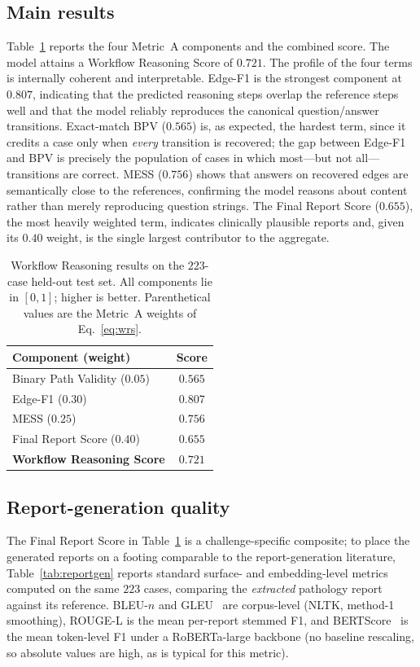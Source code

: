\documentclass[11pt]{article}
\begin{document}
\subsection{Main results}
Table~\ref{tab:test} reports the four Metric~A components and the combined score.
The model attains a Workflow Reasoning Score of $\mathbf{0.721}$. The profile of
the four terms is internally coherent and interpretable. Edge-F1 is the strongest
component at $0.807$, indicating that the predicted reasoning steps overlap the
reference steps well and that the model reliably reproduces the canonical
question/answer transitions. Exact-match BPV ($0.565$) is, as expected, the
hardest term, since it credits a case only when \emph{every} transition is
recovered; the gap between Edge-F1 and BPV is precisely the population of cases in
which most---but not all---transitions are correct. MESS ($0.756$) shows that answers on recovered edges
are semantically close to the references, confirming the model reasons about
content rather than merely reproducing question strings. The Final Report Score
($0.655$), the most heavily weighted term, indicates clinically plausible reports
and, given its $0.40$ weight, is the single largest contributor to the aggregate.

\begin{table}[t]
\centering
\caption{Workflow Reasoning results on the $223$-case held-out test set. All
components lie in $[0,1]$; higher is better. Parenthetical values are the
Metric~A weights of Eq.~\eqref{eq:wrs}.}
\label{tab:test}
\begin{tabular}{lc}
\toprule
\textbf{Component (weight)} & \textbf{Score}\\
\midrule
Binary Path Validity \;($0.05$) & $0.565$\\
Edge-F1 \;($0.30$)              & $0.807$\\
MESS \;($0.25$)                 & $0.756$\\
Final Report Score \;($0.40$)   & $0.655$\\
\midrule
\textbf{Workflow Reasoning Score} & $\mathbf{0.721}$\\
\bottomrule
\end{tabular}
\end{table}

\subsection{Report-generation quality}
\label{sec:reportgen}
The Final Report Score in Table~\ref{tab:test} is a challenge-specific composite;
to place the generated reports on a footing comparable to the report-generation
literature, Table~\ref{tab:reportgen} reports standard surface- and
embedding-level metrics computed on the same $223$ cases, comparing the
\emph{extracted} pathology report against its reference. BLEU-$n$ and
GLEU~\cite{wu2016gnmt} are corpus-level (NLTK, method-1 smoothing), ROUGE-L is the
mean per-report stemmed F1, and BERTScore~\cite{zhang2020bertscore} is the mean
token-level F1 under a RoBERTa-large backbone (no baseline rescaling, so absolute
values are high, as is typical for this metric).
\end{document}
